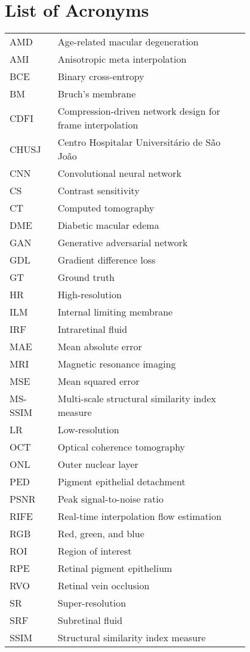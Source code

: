 \chapter*{List of Acronyms}

\begin{flushleft}
\begin{tabular}{l p{0.8\linewidth}}
	
AMD      & Age-related macular degeneration\\
AMI 	 & Anisotropic meta interpolation\\
BCE		 & Binary cross-entropy\\
BM   	 & Bruch's membrane\\
CDFI 	 & Compression-driven network design for frame interpolation\\
CHUSJ 	 & Centro Hospitalar Universitário de São João\\
CNN      & Convolutional neural network\\
CS 		 & Contrast sensitivity\\
CT 		 & Computed tomography\\
DME      & Diabetic macular edema\\
GAN 	 & Generative adversarial network\\
GDL 	 & Gradient difference loss\\
GT  	 & Ground truth\\
HR 		 & High-resolution\\
ILM 	 & Internal limiting membrane\\
IRF      & Intraretinal fluid\\
MAE 	 & Mean absolute error\\
MRI 	 & Magnetic resonance imaging\\
MSE		 & Mean squared error\\	
MS-SSIM  & Multi-scale structural similarity index measure\\
LR 		 & Low-resolution\\
OCT      & Optical coherence tomography\\
ONL      & Outer nuclear layer\\
PED      & Pigment epithelial detachment\\
PSNR 	 & Peak signal-to-noise ratio\\
RIFE	 & Real-time interpolation flow estimation\\
RGB 	 & Red, green, and blue\\
ROI		 & Region of interest\\
RPE      & Retinal pigment epithelium\\
RVO 	 & Retinal vein occlusion\\
SR		 & Super-resolution\\
SRF      & Subretinal fluid\\
SSIM 	 & Structural similarity index measure\\
\end{tabular}
\end{flushleft}

